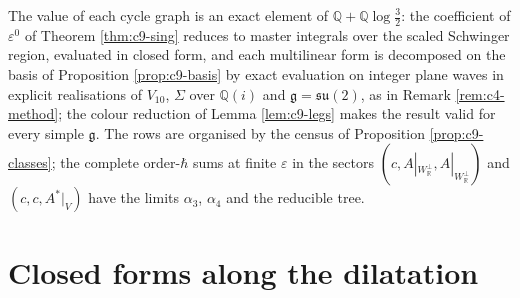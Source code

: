 \begin{remark}
\label{rem:c9-method3}
The value of each cycle graph is an exact element of $\mathbb Q+\mathbb Q\log\tfrac32$: the coefficient of $\varepsilon^0$ of Theorem \ref{thm:c9-sing} reduces to master integrals over the scaled Schwinger region, evaluated in closed form, and each multilinear form is decomposed on the basis of Proposition \ref{prop:c9-basis} by exact evaluation on integer plane waves in explicit realisations of $V_{10}$, $\Sigma$ over $\mathbb Q(i)$ and $\mathfrak g=\mathfrak{su}(2)$, as in Remark \ref{rem:c4-method}; the colour reduction of Lemma \ref{lem:c9-legs} makes the result valid for every simple $\mathfrak g$. The rows are organised by the census of Proposition \ref{prop:c9-classes}; the complete order-$\hbar$ sums at finite $\varepsilon$ in the sectors $(c,A|_{W_{\mathbb R}^\perp},A|_{W_{\mathbb R}^\perp})$ and $(c,c,A^*|_V)$ have the limits $\alpha_3$, $\alpha_4$ and the reducible tree.
\end{remark}

\section{Closed forms along the dilatation}


